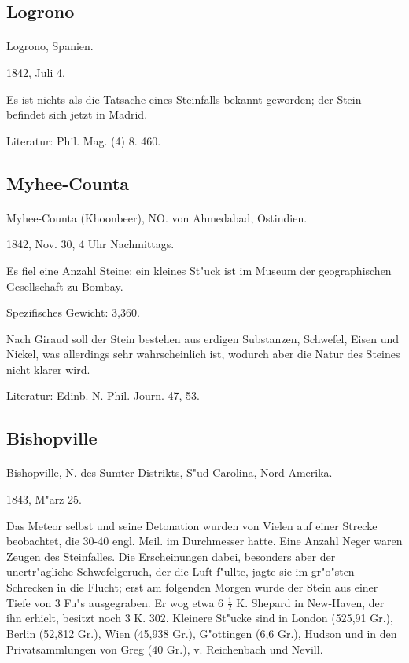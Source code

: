 \documentclass[a4paper, 11pt, oneside]{article}
\begin{document}
\subsection{Logrono}
\normalsize
\paragraph{}
Logrono, Spanien.

1842, Juli 4.

Es ist nichts als die Tatsache eines Steinfalls bekannt geworden; der Stein befindet sich jetzt in Madrid.

\footnotesize
Literatur: Phil. Mag. (4) 8. 460.

\subsection{Myhee-Counta}
\normalsize
\paragraph{}
Myhee-Counta (Khoonbeer), NO. von Ahmedabad, Ostindien.

1842, Nov. 30, 4 Uhr Nachmittags.

Es fiel eine Anzahl Steine; ein kleines St"uck ist im Museum der geographischen Gesellschaft zu Bombay.

Spezifisches Gewicht: 3,360.

Nach Giraud soll der Stein bestehen aus erdigen Substanzen, Schwefel, Eisen und Nickel, was allerdings sehr wahrscheinlich ist, wodurch aber die Natur des Steines nicht klarer wird.

\footnotesize
Literatur: Edinb. N. Phil. Journ. 47, 53.

\subsection{Bishopville}
\normalsize
\paragraph{}
Bishopville, N. des Sumter-Distrikts, S"ud-Carolina, Nord-Amerika.

1843, M"arz 25.

Das Meteor selbst und seine Detonation wurden von Vielen auf einer Strecke beobachtet, die 30-40 engl. Meil. im Durchmesser hatte. Eine Anzahl Neger waren Zeugen des Steinfalles. Die Erscheinungen dabei, besonders aber der unertr"agliche Schwefelgeruch, der die Luft f"ullte, jagte sie im gr"o"sten Schrecken in die Flucht; erst am folgenden Morgen wurde der Stein aus einer Tiefe von 3 Fu"s ausgegraben. Er wog etwa 6 $\frac{1}{2}$ K. Shepard in New-Haven, der ihn erhielt, besitzt noch 3 K. 302. Kleinere St"ucke sind in London (525,91 Gr.), Berlin (52,812 Gr.), Wien (45,938 Gr.), G"ottingen (6,6 Gr.), Hudson und in den Privatsammlungen von Greg (40 Gr.), v. Reichenbach und Nevill.
\end{document}

